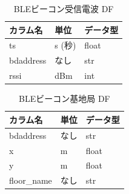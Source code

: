 \begin{table}[ht]
	\centering
	\begin{tabular}{lll}
		\toprule
		カラム名      & 単位    & データ型  \\
		\midrule
		ts        & s (秒) & float \\
		bdaddress & なし    & str   \\
		rssi      & dBm   & int   \\
		\bottomrule
	\end{tabular}
	\caption{BLEビーコン受信電波 DF}
\end{table}

\begin{table}[ht]
	\centering
	\begin{tabular}{lll}
		\toprule
		カラム名        & 単位 & データ型  \\
		\midrule
		bdaddress   & なし & str   \\
		x           & m  & float \\
		y           & m  & float \\
		floor\_name & なし & str   \\
		\bottomrule
	\end{tabular}
	\caption{BLEビーコン基地局 DF}
\end{table}
